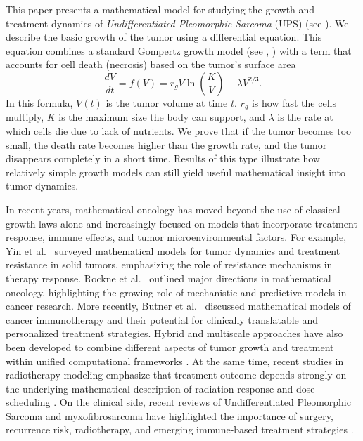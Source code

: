 \documentclass[11pt, reqno]{amsart}
\numberwithin{equation}{section}
\theoremstyle{definition}
\begin{document}
This paper presents a mathematical model for studying the growth and
treatment dynamics of \textit{Undifferentiated Pleomorphic Sarcoma}
(UPS) (see \cite{Winchester2018}). We describe the basic growth of the tumor using a differential equation. This equation combines a standard Gompertz growth model (see \cite{Laird1964}, \cite{Wheldon1988}) with a term that accounts for cell death (necrosis) based on the tumor's surface area
\begin{equation*}
\frac{dV}{dt} = f(V) = r_{g}V \ln\left(\frac{K}{V}\right) - \lambda V^{2/3}. 
\end{equation*}
In this formula, $V(t)$ is the tumor volume at time $t$. $r_g$ is how fast the cells multiply, $K$ is the maximum size the body can support, and $\lambda$ is the rate at which cells die due to lack of nutrients. We prove that if the tumor becomes too small, the death rate becomes higher than the growth rate, and the tumor disappears completely in a short time. Results of this type illustrate how relatively simple growth models can still yield useful mathematical insight into tumor dynamics.


In recent years, mathematical oncology has moved beyond the use of classical growth laws alone and increasingly focused on models that incorporate treatment response, immune effects, and tumor microenvironmental factors. For example, Yin et al.~\cite{Yin2019}
surveyed mathematical models for tumor dynamics and treatment resistance in solid tumors, emphasizing the role of resistance
mechanisms in therapy response. Rockne et al.~\cite{Rockne2019Roadmap} outlined major directions in mathematical oncology, highlighting the growing role of mechanistic and predictive models in cancer research. More recently, Butner et al.~\cite{Butner2022} discussed mathematical models of cancer immunotherapy and their potential for clinically
translatable and personalized treatment strategies. Hybrid and multiscale approaches have also been developed to combine different
aspects of tumor growth and treatment within unified computational frameworks \cite{Chamseddine2020,SinghPaquin2024}. At the same time, recent studies in radiotherapy modeling emphasize that treatment outcome depends strongly on the underlying mathematical
description of radiation response and dose scheduling \cite{Kutuva2023,Zheng2025}. On the clinical side, recent reviews of
Undifferentiated Pleomorphic Sarcoma and myxofibrosarcoma have highlighted the importance of surgery, recurrence risk, radiotherapy, and emerging immune-based treatment strategies \cite{Crago2022,Dalal2024, Sun2023}.
\end{document}
